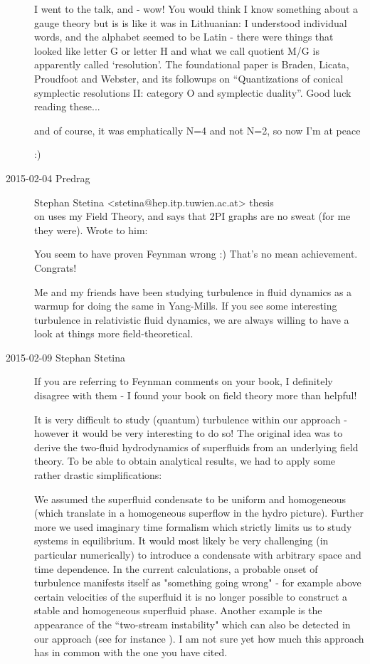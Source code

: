 \begin{description}
I went to the talk, and - wow! You would think I know something about a
gauge theory but is is like it was in Lithuanian: I understood individual
words, and the alphabet seemed to be Latin - there were things that
looked like letter G or letter H and what we call quotient M/G is
apparently called `resolution'. The foundational paper is Braden, Licata,
Proudfoot and Webster, and its followups on
``Quantizations of conical symplectic resolutions II: category O and
symplectic duality''. Good luck reading these...

and of course, it was emphatically N=4 and not N=2, so now I'm at peace

:)

\item[2015-02-04 Predrag] Stephan Stetina
    <stetina@hep.itp.tuwien.ac.at> thesis \\
    on  uses my
     {Field Theory}, and says
    that 2PI graphs are no sweat (for me they were). Wrote to him:

You seem to have
{proven Feynman wrong} :) That's no mean achievement. Congrats!

Me and my friends have been studying turbulence in fluid dynamics as a
warmup for doing the same in Yang-Mills. If you see some interesting
turbulence in relativistic fluid dynamics, we are always willing to have
a look at things more field-theoretical.

\item[2015-02-09 Stephan Stetina]
If you are referring to Feynman comments on your book, I definitely disagree
with them - I found your book on field theory more than helpful!

It is very difficult to study (quantum) turbulence within our approach -
however it would be very interesting to do so! The original idea was to
derive the two-fluid hydrodynamics of superfluids from an underlying
field theory. To be able to obtain analytical results, we had to apply
some rather drastic simplifications:

We assumed the superfluid condensate to be uniform and homogeneous (which
translate in a homogeneous superflow in the hydro picture). Further more
we used imaginary time formalism which strictly limits us to study
systems in equilibrium. It would most likely be very challenging (in
particular numerically) to introduce a condensate with arbitrary space
and time dependence. In the current calculations, a probable onset of
turbulence manifests itself as "something going wrong" - for example
above certain velocities of the superfluid it is no longer possible to
construct a stable and homogeneous superfluid phase. Another example is
the appearance of the ``two-stream instability" which can also be detected
in our approach (see for instance ).
I am not sure yet how much this approach has in common with the one you
have cited.


\end{description}
